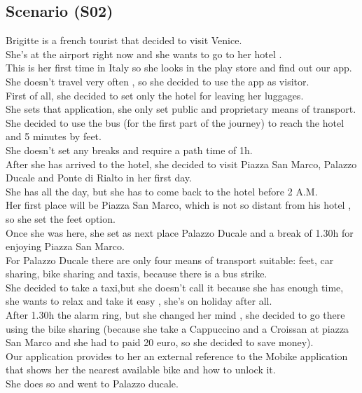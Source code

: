 \documentclass[a4paper,leqno]{book}
\begin{document}
\subsection{Scenario (S02) }
Brigitte is a french tourist that decided to visit Venice.\\
She's at the airport right now and she wants to go to her hotel .\\
This is her first time in Italy so she looks in the play store and find out our app.\\
She doesn't travel very often , so she decided to use the app as visitor.\\
First of all, she decided to set only the hotel for leaving her luggages.\\
She sets that application, she only set public and proprietary means of transport.\\
She decided to use the bus (for the first part of the journey) to reach the hotel and 5 minutes by feet.\\
She doesn't set any breaks and require a path time of 1h.\\
After she has arrived to the hotel, she decided to visit Piazza San Marco, Palazzo Ducale and Ponte di Rialto in her first day.\\
She has all the day, but she has to come back to the hotel before 2 A.M.\\
Her first place will be Piazza San Marco, which is not so distant from his hotel , so she set the feet option.\\
Once she was here, she set as next place Palazzo Ducale  and a break of 1.30h for enjoying Piazza San Marco.\\
For Palazzo Ducale there are only four means of transport suitable: feet, car sharing, bike sharing and taxis, because there is a bus strike.\\
She decided to take a taxi,but she doesn't call it because she has enough time,  she wants to relax and take it easy , she's on holiday after all.\\
After 1.30h the alarm ring, but she changed her mind , she decided to go there using the bike sharing (because she take a Cappuccino and a Croissan at piazza San Marco and she had to paid 20 euro, so she decided to save money).\\
Our application provides to her an external reference to the Mobike application that shows her the nearest available bike and how to unlock it.\\
She does so  and went to Palazzo ducale.\\
\end{document}

